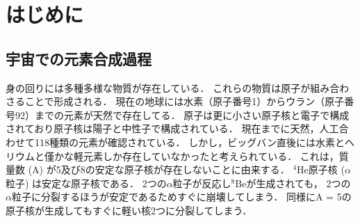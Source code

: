 \documentclass[../master]{subfiles}
\begin{document}
\chapter{はじめに}
\section{宇宙での元素合成過程}
\label{seq::nucleaosynthesis}
身の回りには多種多様な物質が存在している．
これらの物質は原子が組み合わさることで形成される．
現在の地球には水素（原子番号1）からウラン（原子番号92）までの元素が天然で存在してる．
原子は更に小さい原子核と電子で構成されており原子核は陽子と中性子で構成されている．
現在までに天然，人工合わせて118種類の元素が確認されている．
しかし，ビッグバン直後には水素とヘリウムと僅かな軽元素しか存在していなかったと考えられている．
これは，質量数 (A) が5及び8の安定な原子核が存在しないことに由来する．
${}^{4}\mathrm{He}$原子核 ($\alpha$粒子) は安定な原子核である．
2つの$\alpha$粒子が反応し${}^{8}\mathrm{Be}$が生成されても，
2つの$\alpha$粒子に分裂するほうが安定であるためすぐに崩壊してしまう．
同様にA = 5の原子核が生成してもすぐに軽い核2つに分裂してしまう．
\end{document}
